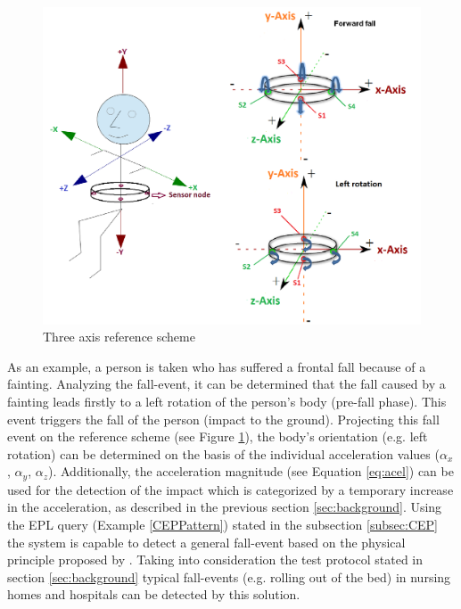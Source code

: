 \documentclass[review]{elsarticle}
\begin{document}
\begin{figure}[!ht]
	\centering
	\includegraphics[scale=0.32]{images/axis}
	\caption[Three axis reference scheme]{Three axis reference scheme \cite{LaBlunda.2016,LuigiMasterThesis}}
	\label{fig:ReferenceScheme}
\end{figure}

As an example, a person is taken who has suffered a frontal fall because of a fainting. Analyzing the fall-event, it can be determined that the fall caused by a fainting leads firstly to a left rotation of the person's body (pre-fall phase). This event triggers the fall of the person (impact to the ground). Projecting this fall event on the reference scheme (see Figure \ref{fig:ReferenceScheme}), the body's orientation (e.g. left rotation) can be determined on the basis of the individual acceleration values ($\alpha_x$,  $\alpha_y$,  $\alpha_z$). Additionally, the acceleration magnitude (see Equation \ref{eq:acel}) can be used for the detection of the impact which is categorized by a temporary increase in the acceleration, as described in the previous section \ref{sec:background}. Using the EPL query (Example \ref{CEPPattern}) stated in the subsection \ref{subsec:CEP} the system is capable to detect a general fall-event based on the physical principle proposed by \cite{Kozina}.
Taking into consideration the test protocol stated in section \ref{sec:background} typical fall-events (e.g. rolling out of the bed) in nursing homes and hospitals can be detected by this solution.
\end{document}
